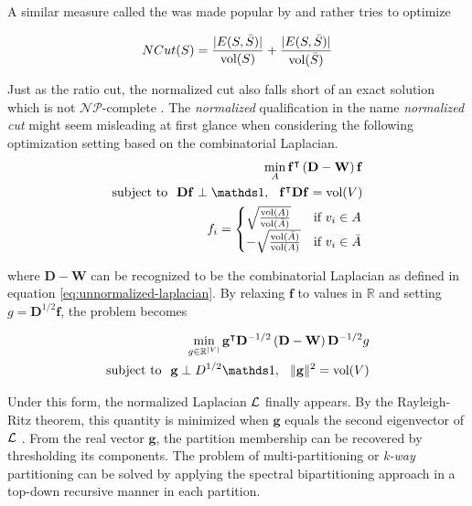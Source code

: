 A similar measure called the  was made popular by \cite{ShiMalik2000} and rather tries to optimize

\begin{equation}
NCut(S) = \frac{|E(S, \bar{S})|}{\operatorname{\text{vol}}(S)} + \frac{|E(S, \bar{S})|}{\operatorname{\text{vol}}(\bar{S})}
\label{eq:ncut}
\end{equation}

Just as the ratio cut, the normalized cut also falls short of an exact solution which is not
$\mathcal{NP}$-complete \parencite{ShiMalik2000}. The \textit{normalized} qualification in
the name \textit{normalized cut} might seem misleading at first glance when considering the following optimization setting \parencite{Luxburg2007} based  on the combinatorial Laplacian.
\begin{align}
\min_A \mathbf{f}^\transpose \left( \mathbf{D} - \mathbf{W} \right) \mathbf{f} \\
\text{subject to} \hspace{2.5mm} \mathbf{D} \mathbf{f} \perp \indicator, \hspace{2.5mm}  \mathbf{f}^\transpose \mathbf{D} \mathbf{f} = \vol(V) \notag \\
f_i = \begin{cases}
\sqrt{\frac{\vol(A)}{\vol(\bar{A})}} & \text{if $v_i \in A$} \\
-\sqrt{\frac{\vol(\bar{A})}{\vol(A)}} & \text{if $v_i \in \bar{A}$} 
\end{cases} \notag
\end{align}

where $\mathbf{D} - \mathbf{W}$ can be recognized to be the combinatorial Laplacian
as defined in equation \ref{eq:unnormalized-laplacian}.  By relaxing $\mathbf{f}$ to 
values in $\mathbb{R}$ and setting $g = \mathbf{D}^{1/2}
\mathbf{f}$, the problem becomes

\begin{align}
\min_{g \in \mathbb{R}^{|V|}} \mathbf{g}^\transpose\mathbf{D}^{-1/2}\left( \mathbf{D} - \mathbf{W} \right) \mathbf{D}^{-1/2} g \\
\text{subject to} \hspace{2.5mm} \mathbf{g} \perp D^{1/2} \indicator, \hspace{2.5mm}  \| \mathbf{g} \|^2 = \vol(V) \notag \\
\end{align}

Under this form, the normalized Laplacian $\mathbf{\mathcal{L}}$ finally appears. By the Rayleigh-Ritz theorem, this
quantity is minimized when $\mathbf{g}$ equals the second eigenvector of $\mathbf{\mathcal{L}}$
\parencite{Chung1997}. From the real vector $\mathbf{g}$, the partition membership can be recovered
by thresholding its components. The problem of multi-partitioning or \textit{k-way} partitioning can be solved by applying the spectral bipartitioning approach in a top-down recursive manner in each partition.

